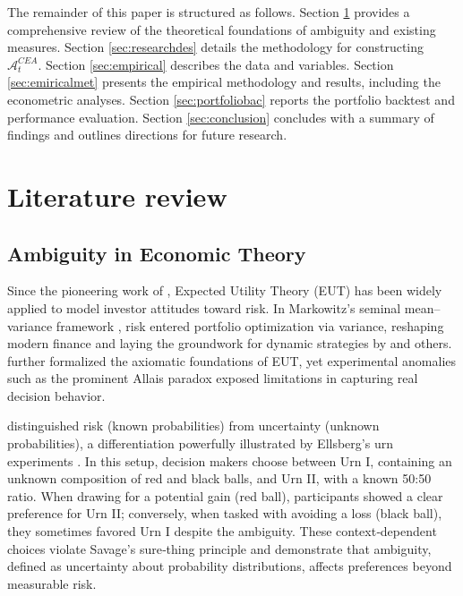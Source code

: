 \documentclass[preprint,12pt,authoryear]{elsarticle}
\renewcommand{\textcolor}[2]{\begingroup\color{#1}#2\endgroup}
\begin{document}
\textcolor{red}{The remainder of this paper is structured as follows. Section \ref{sec:literaturerev} provides a comprehensive review of the theoretical foundations of ambiguity and existing measures. Section \ref{sec:researchdes} details the methodology for constructing $\mathcal{A}^{CEA}_t$. Section \ref{sec:empirical} describes the data and variables. Section \ref{sec:emiricalmet} presents the empirical methodology and results, including the econometric analyses. Section \ref{sec:portfoliobac} reports the portfolio backtest and performance evaluation. Section \ref{sec:conclusion} concludes with a summary of findings and outlines directions for future research.}

\section{Literature review}
\label{sec:literaturerev}

\subsection{Ambiguity in Economic Theory}
Since the pioneering work of \cite{neumann1947}, Expected Utility Theory (EUT) has been widely applied to model investor attitudes toward risk. In Markowitz's seminal mean–variance framework \citep{markowitz1952}, risk entered portfolio optimization via variance, reshaping modern finance and laying the groundwork for dynamic strategies by \cite{merton1971} and others. \cite{savage1954} further formalized the axiomatic foundations of EUT, yet experimental anomalies such as the prominent Allais paradox \citep{allais1953} exposed limitations in capturing real decision behavior.

\cite{knight1921} distinguished risk (known probabilities) from uncertainty (unknown probabilities), a differentiation powerfully illustrated by Ellsberg's urn experiments \citep{ellsberg1961}. In this setup, decision makers choose between Urn I, containing an unknown composition of red and black balls, and Urn II, with a known 50:50 ratio. When drawing for a potential gain (red ball), participants showed a clear preference for Urn II; conversely, when tasked with avoiding a loss (black ball), they sometimes favored Urn I despite the ambiguity. These context‑dependent choices violate Savage's sure‑thing principle and demonstrate that ambiguity, defined as uncertainty about probability distributions, affects preferences beyond measurable risk.
\end{document}
